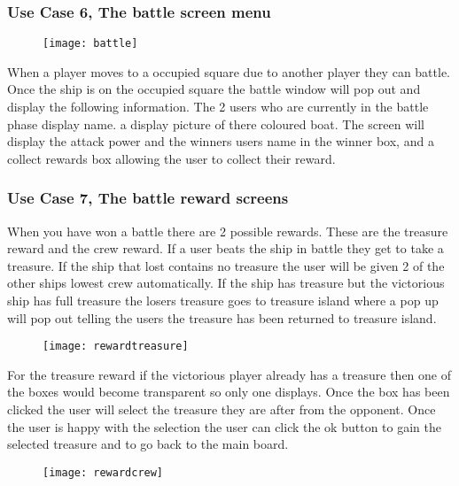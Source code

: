 \documentclass{article}
\begin{document}
	\subsubsection{Use Case 6, The battle screen menu}
	
		\begin{figure}[H]
		\centering
		\texttt{[image: battle]}
		\label{fig:battle}
		\end{figure}
	
When a player moves to a occupied square due to another player they can battle. Once the ship is on the occupied square the battle window will pop out and display the following information. The 2 users who are currently in the battle phase display name. a display picture of there coloured boat. The screen will display the attack power and the winners users name in the winner box, and a collect rewards box allowing the user to collect their reward. 

	\subsubsection{Use Case 7, The battle reward screens}
	
	When you have won a battle there are 2 possible rewards. These are the treasure reward and the crew reward. If a user beats the ship in battle they get to take a treasure. If the ship that lost contains no treasure the user will be given 2 of the other ships lowest crew automatically. If the ship has treasure but the victorious ship has full treasure the losers treasure goes to treasure island where a pop up will pop out telling the users the treasure has been returned to treasure island.
	
		\begin{figure}[H]
		\centering
		\texttt{[image: rewardtreasure]}
		\label{fig:treasureprize}
		\end{figure}

For the treasure reward if the victorious player already has a treasure then one of the boxes would become transparent so only one displays. Once the box has been clicked the user will select the treasure they are after from the opponent. Once the user is happy with the selection the user can click the ok button to gain the selected treasure and to go back to the main board.

		\begin{figure}[H]
		\centering
		\texttt{[image: rewardcrew]}
		\label{fig:crewreward}
		\end{figure}
		
\end{document}
